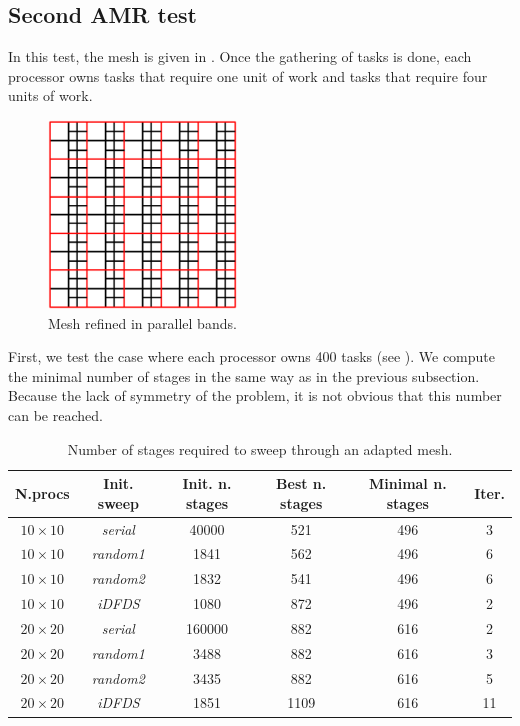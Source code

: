 \documentclass{mc2015}
\renewcommand{\(}{\left(}
\renewcommand{\)}{\right)}
\renewcommand{\[}{\left[}
\renewcommand{\]}{\right]}
\begin{document}
\subsection{Second AMR test}

In this test, the mesh is given in . Once the gathering of tasks is
done, each processor owns tasks that require one unit of work and tasks that
require four units of work.
\begin{figure}[H]
  \centering
  \includegraphics[width=5cm]{mesh_2}
  \caption{Mesh refined in parallel bands.}
  \label{mesh_2}
\end{figure}

First, we test the case where each processor owns 400 tasks (see ).
We compute the minimal number of stages in the same way as in the previous subsection. Because
the lack of symmetry of the problem, it is not obvious that this number can be reached.

\begin{table}[H]
  \begin{center}
    \caption{Number of stages required to sweep through an adapted mesh.}
    \begin{tabular}{|c|c|c|c|c|c|}
      \hline
      N.procs & Init. sweep & Init. n. stages & Best n. stages & Minimal n. stages & Iter. \\
      \hline
      $10 \times 10$ &  \emph{serial} &  40000 &  521 & 496 &  3 \\
      $10 \times 10$ & \emph{random1} &   1841 &  562 & 496 &  6 \\
      $10 \times 10$ & \emph{random2} &   1832 &  541 & 496 &  6 \\
      $10 \times 10$ &   \emph{iDFDS} &   1080 &  872 & 496 &  2 \\
      $20 \times 20$ &  \emph{serial} & 160000 &  882 & 616 &  2 \\
      $20 \times 20$ & \emph{random1} &   3488 &  882 & 616 &  3 \\
      $20 \times 20$ & \emph{random2} &   3435 &  882 & 616 &  5 \\
      $20 \times 20$ &   \emph{iDFDS} &   1851 & 1109 & 616 & 11 \\
      \hline
    \end{tabular}
    \label{band_1}
  \end{center}
\end{table}
\end{document}
